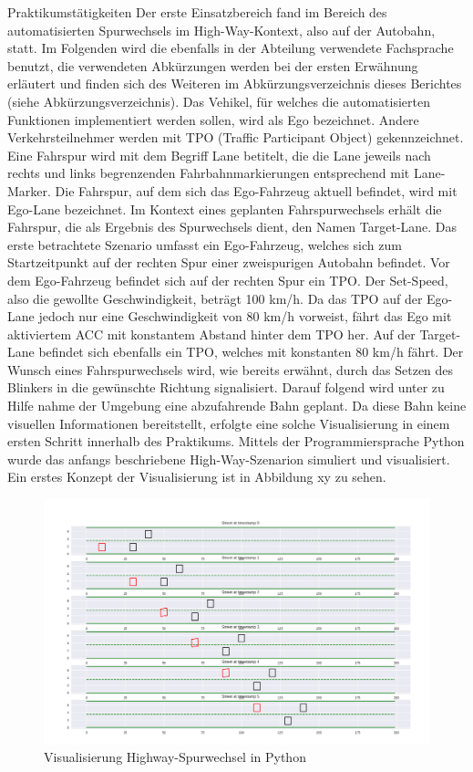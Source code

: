 Praktikumstätigkeiten
Der erste Einsatzbereich fand im Bereich des automatisierten Spurwechsels im High-Way-Kontext, also auf der Autobahn, statt. Im Folgenden wird die ebenfalls in der Abteilung verwendete Fachsprache benutzt, die verwendeten Abkürzungen werden bei der ersten Erwähnung erläutert und finden sich des Weiteren im Abkürzungsverzeichnis dieses Berichtes (siehe Abkürzungsverzeichnis). Das Vehikel, für welches die automatisierten Funktionen implementiert werden sollen, wird als Ego bezeichnet. Andere Verkehrsteilnehmer werden mit TPO (Traffic Participant Object) gekennzeichnet. Eine Fahrspur wird mit dem Begriff Lane betitelt, die die Lane jeweils nach rechts und links begrenzenden Fahrbahnmarkierungen entsprechend mit Lane-Marker. Die Fahrspur, auf dem sich das Ego-Fahrzeug aktuell befindet, wird mit Ego-Lane bezeichnet. Im Kontext eines geplanten Fahrspurwechsels erhält die Fahrspur, die als Ergebnis des Spurwechsels dient, den Namen Target-Lane. Das erste betrachtete Szenario umfasst ein Ego-Fahrzeug, welches sich zum Startzeitpunkt auf der rechten Spur einer zweispurigen Autobahn befindet. Vor dem Ego-Fahrzeug befindet sich auf der rechten Spur ein TPO. Der Set-Speed, also die gewollte Geschwindigkeit, beträgt 100 km/h. Da das TPO auf der Ego-Lane jedoch nur eine Geschwindigkeit von 80 km/h vorweist, fährt das Ego mit aktiviertem ACC mit konstantem Abstand hinter dem TPO her. Auf der Target-Lane befindet sich ebenfalls ein TPO, welches mit konstanten 80 km/h fährt. Der Wunsch eines Fahrspurwechsels wird, wie bereits erwähnt, durch das Setzen des Blinkers in die gewünschte Richtung signalisiert. Darauf folgend wird unter zu Hilfe nahme der Umgebung eine abzufahrende Bahn geplant. Da diese Bahn keine visuellen Informationen bereitstellt, erfolgte eine solche Visualisierung in einem ersten Schritt innerhalb des Praktikums. Mittels der Programmiersprache Python wurde das anfangs beschriebene High-Way-Szenarion simuliert und visualisiert. Ein erstes Konzept der Visualisierung ist in Abbildung xy zu sehen. 

\begin{figure}[!ht]
	\begin{center}
		\includegraphics[width=1.0\linewidth]{Abbildungen/bericht/lanechange_visualization}
		\caption{Visualisierung Highway-Spurwechsel in Python}
		\label{fig.highway_spurwechsel_python}
	\end{center}
\end{figure} 

